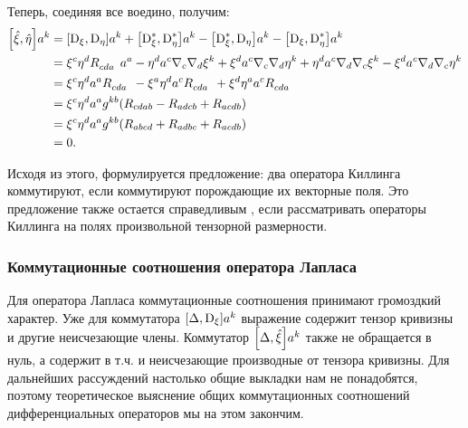 \documentclass[12pt,a4paper]{article}
\begin{document}
            Теперь, соединяя все воедино, получим:
            \begin{equation}\begin{aligned}
                \comm{\Op{\xi}}{\Op{\eta}} a^k
                    &= \comm{\D_\xi}{\D_\eta} a^k
                     + \comm{\D^{*}_\xi}{\D^{*}_\eta} a^k
                     - \comm{\D^{*}_\xi}{\D_\eta} a^k
                     - \comm{\D_\xi}{\D^{*}_\eta} a^k \\
                    &= \xi^c \eta^d R_{cda}^{\hphantom{cdak}} a^a
                     - \eta^d a^c \nabla_c \nabla_d \xi^k
                     + \xi^d a^c \nabla_c \nabla_d \eta^k
                     + \eta^d a^c \nabla_d \nabla_c \xi^k
                     - \xi^d a^c \nabla_d \nabla_c \eta^k \\
                    &= \xi^c \eta^d a^a R_{cda}^{\hphantom{cdak}}
                     - \xi^a \eta^d a^c R_{cda}^{\hphantom{cdak}}
                     + \xi^d \eta^a a^c R_{cda}^{\hphantom{cdak}} \\
                    &= \xi^c \eta^d a^a g^{kb} \qty(
                        R_{cdab} - R_{adcb} + R_{acdb}
                    ) \\
                    &= \xi^c \eta^d a^a g^{kb} \qty(
                        R_{abcd} + R_{adbc} + R_{acdb}
                    ) \\
                    &= 0 .
            \end{aligned}\end{equation}

            Исходя из этого, формулируется предложение: два оператора Киллинга коммутируют, если коммутируют порождающие их векторные поля. Это предложение также остается справедливым \cite{burlankov_space_dynamics}, если рассматривать операторы Киллинга на полях произвольной тензорной размерности.


        \subsubsection{Коммутационные соотношения оператора Лапласа}

            Для оператора Лапласа коммутационные соотношения принимают громоздкий характер. Уже для коммутатора $\comm{\Delta}{\D_\xi} a^k$ выражение содержит тензор кривизны и другие неисчезающие члены. Коммутатор $\comm{\Delta}{\Op{\xi}} a^k$ также не обращается в нуль, а содержит в т.ч. и неисчезающие производные от тензора кривизны. Для дальнейших рассуждений настолько общие выкладки нам не понадобятся, поэтому теоретическое выяснение общих коммутационных соотношений дифференциальных операторов мы на этом закончим.
\end{document}
